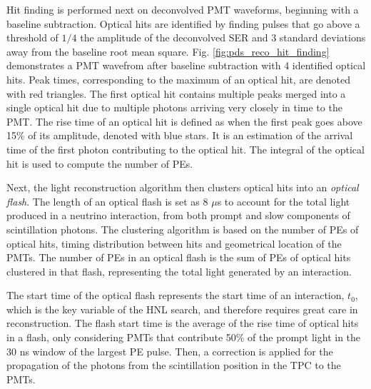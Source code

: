 Hit finding is performed next on deconvolved PMT waveforms, beginning with a baseline subtraction.
Optical hits are identified by finding pulses that go above a threshold of $1/4$ the amplitude of the deconvolved SER and 3 standard deviations away from the baseline root mean square.
Fig. \ref{fig:pds_reco_hit_finding} demonstrates a PMT wavefrom after baseline subtraction with 4 identified optical hits.
Peak times, corresponding to the maximum of an optical hit, are denoted with red triangles.
The first optical hit contains multiple peaks merged into a single optical hit due to multiple photons arriving very closely in time to the PMT.
The rise time of an optical hit is defined as when the first peak goes above 15\% of its amplitude, denoted with blue stars.
It is an estimation of the arrival time of the first photon contributing to the optical hit. 
The integral of the optical hit is used to compute the number of PEs.

Next, the light reconstruction algorithm then clusters optical hits into an \textit{optical flash}.                                                                                            
The length of an optical flash is set as 8 $\mu$s to account for the total light produced in a neutrino interaction, from both prompt and slow components of scintillation photons.
The clustering algorithm is based on the number of PEs of optical hits, timing distribution between hits and geometrical location of the PMTs.                                                  
The number of PEs in an optical flash is the sum of PEs of optical hits clustered in that flash, representing the total light generated by an interaction. 

The start time of the optical flash represents the start time of an interaction, $t_0$, which is the key variable of the HNL search, and therefore requires great care in reconstruction.
The flash start time is the average of the rise time of optical hits in a flash, only considering PMTs that contribute 50\% of the prompt light in the 30 ns window of the largest PE pulse.
Then, a correction is applied for the propagation of the photons from the scintillation position in the TPC to the PMTs.

